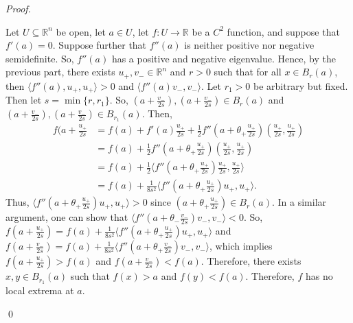 \documentclass[12pt]{article}
\newenvironment{problem}[2][Problem]{\begin{trivlist}
\item[\hskip \labelsep {\bfseries #1}\hskip \labelsep {\bfseries
#2.}]}{\end{trivlist}}
\newenvironment{sol}
    {\emph{Proof.}
    }
    {
    \qed
    }
\begin{document}
\begin{problem}{18}
\begin{itemize}
      \begin{sol}
      Let $U \subseteq \mathbb{R}^n$ be open, let $a \in U$, let $f : U \to \mathbb{R}$ be a $C^2$ function, and suppose that $f'(a) = 0$. Suppose further that $f''(a)$ is neither positive nor negative semidefinite. So, $f''(a)$ has a positive and negative eigenvalue. Hence, by the previous part, there exists $u_+,v_- \in \mathbb{R}^n$ and $r > 0$ such that for all $x \in B_r(a)$, then $\langle f''(a),u_+, u_+ \rangle > 0$ and $\langle f''(a)v_-, v_- \rangle$. Let $r_1 > 0$ be arbitrary but fixed. Then let $s = \min\{r,r_1\}$. So, $(a+\frac{v_-}{2s}),(a+\frac{v_-}{2s}) \in B_r(a)$ and $(a+\frac{v_-}{2s}),(a+\frac{v_-}{2s}) \in B_{r_1}(a)$. Then, \begin{align}
          f(a + \frac{u_+}{2s} &= f(a) + f'(a)\frac{u_+}{2s} + \frac{1}{2}f''(a + \theta_+ \frac{u_+}{2s})(\frac{u_+}{2s},\frac{u_+}{2s}) \tag*{($0 < \theta_+ < 1$)} \\ &= f(a) +  \frac{1}{2}f''(a + \theta_+ \frac{u_+}{2s})(\frac{u_+}{2s},\frac{u_+}{2s}) \tag*{(Since we know $f'(a) = 0$)} \\ &= f(a) + \frac{1}{2}\langle f''(a + \theta_+\frac{u_+}{2s})\frac{u_+}{2s},\frac{u_+}{2s}\rangle \\ &= f(a) + \frac{1}{8s^2}\langle f''(a + \theta_+\frac{u_+}{2s})u_+,u_+\rangle.
      \end{align}
      Thus, $\langle f''(a + \theta_+\frac{u_+}{2s})u_+,u_+\rangle > 0$ since $(a + \theta_+\frac{u_+}{2s}) \in B_r(a)$. In a similar argument, one can show that $\langle f''(a + \theta_-\frac{v_-}{2s})v_-,v_-\rangle < 0$. So, $f(a + \frac{u_+}{2s}) = f(a) + \frac{1}{8s^2}\langle f''(a + \theta_+\frac{u_+}{2s})u_+,u_+\rangle$ and $f(a + \frac{v_-}{2s}) = f(a) + \frac{1}{8s^2}\langle f''(a + \theta_+\frac{v_-}{2s})v_-,v_-\rangle$, which implies $f(a + \frac{u_+}{2s}) > f(a)$ and $f(a + \frac{v_-}{2s})  < f(a)$. Therefore, there exists $x,y \in B_{r_1}(a)$ such that $f(x) > a$ and $f(y) < f(a)$. Therefore, $f$ has no local extrema at $a$.
      \end{sol}
  \end{itemize}
  \end{problem}
  
\end{document}
